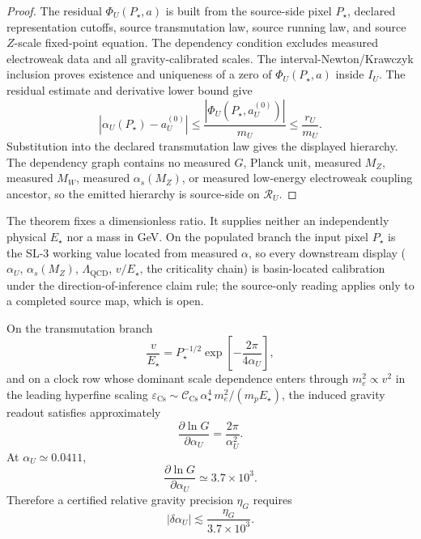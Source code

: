 \begin{proof}
The residual \(\Phi_U(P_\star,a)\) is built from the source-side pixel \(P_\star\), declared
representation cutoffs, source transmutation law, source running law, and source \(Z\)-scale
fixed-point equation. The dependency condition excludes measured electroweak data and all
gravity-calibrated scales. The interval-Newton/Krawczyk inclusion proves existence and uniqueness
of a zero of \(\Phi_U(P_\star,a)\) inside \(I_U\). The residual estimate and derivative lower
bound give
\[
|\alpha_U(P_\star)-a_U^{(0)}|
\le
\frac{|\Phi_U(P_\star,a_U^{(0)})|}{m_U}
\le
\frac{r_U}{m_U}.
\]
Substitution into the declared transmutation law gives the displayed hierarchy. The dependency
graph contains no measured \(G\), Planck unit, measured \(M_Z\), measured \(M_W\), measured
\(\alpha_s(M_Z)\), or measured low-energy electroweak coupling ancestor, so the emitted hierarchy
is source-side on \(\mathcal R_U\).
\end{proof}

The theorem fixes a dimensionless ratio. It supplies neither an independently physical
\(E_\star\) nor a mass in GeV. On the populated branch the input pixel \(P_\star\) is the SL-3
working value located from measured \(\alpha\), so every downstream display (\(\alpha_U\),
\(\alpha_s(M_Z)\), \(\Lambda_{\mathrm{QCD}}\), \(v/E_\star\), the criticality chain) is
basin-located calibration under the direction-of-inference claim rule; the source-only reading
applies only to a completed source map, which is open.

\begin{lemma}\label{lem:alpha-u-sensitivity}
On the transmutation branch
\[
\frac{v}{E_\star}
=
P_\star^{-1/2}
\exp\!\left[
-\frac{2\pi}{4\alpha_U}
\right],
\]
and on a clock row whose dominant scale dependence enters through \(m_e^2\propto v^2\) in the
leading hyperfine scaling \(\varepsilon_{\mathrm{Cs}}\sim\mathcal C_{\mathrm{Cs}}\,
\alpha_\star^4\,m_e^2/(m_pE_\star)\), the induced
gravity readout satisfies approximately
\[
\frac{\partial\ln G}{\partial \alpha_U}
=
\frac{2\pi}{\alpha_U^2}.
\]
At \(\alpha_U\simeq0.0411\),
\[
\frac{\partial\ln G}{\partial \alpha_U}
\simeq
3.7\times10^3.
\]
Therefore a certified relative gravity precision \(\eta_G\) requires
\[
|\delta\alpha_U|
\lesssim
\frac{\eta_G}{3.7\times10^3}.
\]
\end{lemma}

